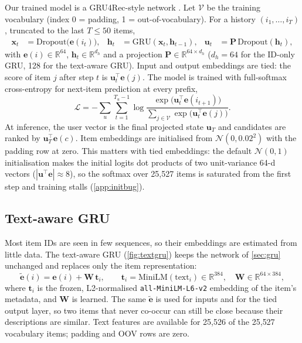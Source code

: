 \documentclass[11pt,a4paper]{article}
\begin{document}
Our trained model is a GRU4Rec-style network \citep{hidasi2016session}. Let
$\mathcal{V}$ be the training vocabulary (index 0 = padding, 1 = out-of-vocabulary). For a
history $(i_1,\dots,i_T)$, truncated to the last $T\le 50$ items,
\begin{align}
  \mathbf{x}_t &= \mathrm{Dropout}\big(\mathbf{e}(i_t)\big), &
  \mathbf{h}_t &= \mathrm{GRU}(\mathbf{x}_t, \mathbf{h}_{t-1}), &
  \mathbf{u}_t &= \mathbf{P}\,\mathrm{Dropout}(\mathbf{h}_t),
\end{align}
with $\mathbf{e}(i)\in\mathbb{R}^{64}$, $\mathbf{h}_t\in\mathbb{R}^{d_h}$ and a projection
$\mathbf{P}\in\mathbb{R}^{64\times d_h}$ ($d_h=64$ for the ID-only GRU, 128 for the text-aware GRU). Input and output embeddings are tied: the score of
item $j$ after step $t$ is $\mathbf{u}_t^{\top}\mathbf{e}(j)$. The model is trained with full-softmax
cross-entropy for next-item prediction at every prefix,
\begin{equation}
  \mathcal{L} = -\sum_{u}\sum_{t=1}^{T_u-1}
  \log\frac{\exp\!\big(\mathbf{u}_t^{\top}\mathbf{e}(i_{t+1})\big)}
            {\sum_{j\in\mathcal{V}}\exp\!\big(\mathbf{u}_t^{\top}\mathbf{e}(j)\big)}.
\end{equation}
At inference, the user vector is the final projected state $\mathbf{u}_T$ and candidates are ranked
by $\mathbf{u}_T^{\top}\mathbf{e}(c)$. Item embeddings are initialised from $\mathcal{N}(0,0.02^2)$
with the padding row at zero. This matters with tied embeddings: the default $\mathcal{N}(0,1)$
initialisation makes the initial logits dot products of two unit-variance 64-d vectors
($|\mathbf{u}^{\top}\mathbf{e}|\approx8$), so the softmax over 25{,}527 items is saturated from the
first step and training stalls (\cref{app:initbug}).

\subsection{Text-aware GRU}
\label{sec:textgru}

Most item IDs are seen in few sequences, so their embeddings are estimated from little data. The
text-aware GRU (\cref{fig:textgru}) keeps the network
of \cref{sec:gru} unchanged and replaces only the item representation:
\begin{equation}
  \tilde{\mathbf{e}}(i) = \mathbf{e}(i) + \mathbf{W}\,\mathbf{t}_i,
  \qquad \mathbf{t}_i = \mathrm{MiniLM}(\text{text}_i)\in\mathbb{R}^{384},
  \quad \mathbf{W}\in\mathbb{R}^{64\times384},
  \label{eq:textgru}
\end{equation}
where $\mathbf{t}_i$ is the frozen, L2-normalised \texttt{all-MiniLM-L6-v2} embedding
\citep{reimers2019sentence,wang2020minilm} of the item's metadata, and $\mathbf{W}$ is learned. The
same $\tilde{\mathbf{e}}$ is used for inputs and for the tied output layer, so two items that never
co-occur can still be close because their descriptions are similar. Text features are available
for 25{,}526 of the 25{,}527 vocabulary items; padding and OOV rows are zero.
\end{document}
